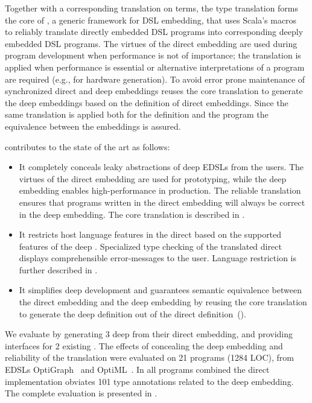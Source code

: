 Together with a corresponding translation on terms, the type
translation forms the core of \yy, a generic framework for DSL
embedding, that uses Scala's macros~\cite{burmako_scala_2013} to
reliably translate directly embedded DSL programs into corresponding
deeply embedded DSL programs.  The virtues of the direct embedding are
used during program development when performance is not of importance;
the translation is applied when performance is essential or
alternative interpretations of a program are required (e.g., for
hardware generation).  To avoid error prone maintenance of
synchronized direct and deep embeddings \yy reuses the core
translation to generate the deep embeddings based on the definition of
direct embeddings. Since the same translation is applied both for the
\edsl definition and the \edsl program the equivalence between the
embeddings is assured.

\yy{} contributes to the state of the art as follows:
\begin{itemize}

  \item It completely conceals leaky abstractions of deep EDSLs from the users.
  The virtues of the direct embedding are used for prototyping, while the deep
  embedding enables high-performance in production. The reliable translation
  ensures that programs written in the direct embedding will always be correct
  in the deep embedding. The core translation is described in .

  \item It restricts host language features in the direct \edsl{} based on the
  supported features of the deep \edsl{}. Specialized type checking of the
  translated direct \edsl{} displays comprehensible error-messages to the user.
  Language restriction is further described in .

  \item It simplifies deep \edsl development and guarantees semantic equivalence
  between the direct embedding and the deep embedding by reusing the core
  translation to generate the deep \edsl definition out of the direct \edsl
  definition~().

\end{itemize}

%
%
We evaluate \yy by generating 3 deep \edsls from their direct
embedding, and providing interfaces for 2 existing \edsls. The effects
of concealing the deep embedding and reliability of the translation
were evaluated on 21 programs (1284 LOC), from EDSLs
OptiGraph~\cite{composition-ecoop2013} and
OptiML~\cite{sujeeth_optiml:_2011}. In all programs combined the
direct implementation obviates 101 type annotations related to the
deep embedding. The complete evaluation is presented in
.

